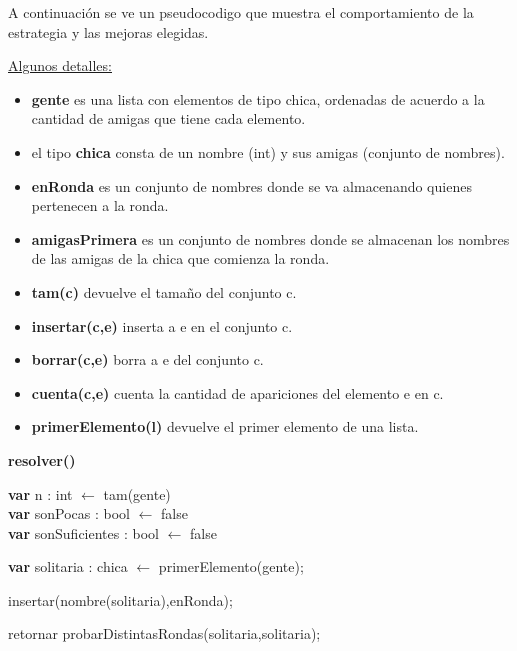 A continuación se ve un pseudocodigo que muestra el comportamiento de la estrategia y las mejoras elegidas.

\vspace{3cm}
\underline{Algunos detalles:}

\begin{itemize}
 \item \textbf{gente} es una lista con elementos de tipo chica, ordenadas de acuerdo a la cantidad de amigas que tiene cada elemento.
 \item el tipo \textbf{chica} consta de un nombre (int) y sus amigas (conjunto de nombres).
 \item \textbf{enRonda} es un conjunto de nombres donde se va almacenando quienes pertenecen a la ronda.
 \item \textbf{amigasPrimera} es un conjunto de nombres donde se almacenan los nombres de las amigas de la chica que comienza la ronda.
 \item \textbf{tam(c)} devuelve el tamaño del conjunto c.
 \item \textbf{insertar(c,e)} inserta a e en el conjunto c.
 \item \textbf{borrar(c,e)} borra a e del conjunto c.
 \item \textbf{cuenta(c,e)} cuenta la cantidad de apariciones del elemento e en c.
 \item \textbf{primerElemento(l)} devuelve el primer elemento de una lista.
\end{itemize}

\newpage

\incmargin{1em}
\linesnumbered
{}

\textbf{resolver()}\\
	\begin{algorithm}[H]
		\BlankLine
		\textbf{var} n : int $\leftarrow$ tam(gente) \\
		\textbf{var} sonPocas : bool $\leftarrow$ false \\
		\textbf{var} sonSuficientes : bool $\leftarrow$ false \\
		

	\textbf{var} solitaria : chica $\leftarrow$ primerElemento(gente);

	insertar(nombre(solitaria),enRonda);

	retornar  probarDistintasRondas(solitaria,solitaria);
	\BlankLine




	  \end{algorithm}
	  


